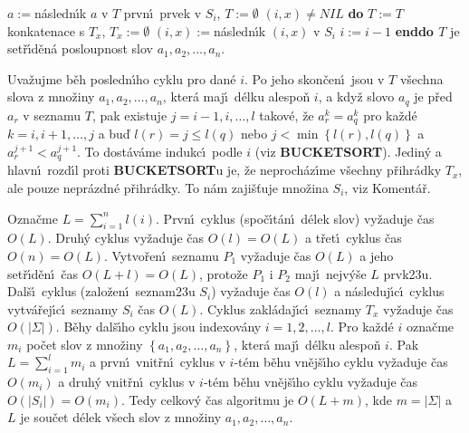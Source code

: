 \phantom{------}$a:=$n\'asledn\'\i k $a$ v $T$\newline 
{}prvn\'\i\ prvek v $S_i$, $T:=\emptyset$\newline 
\phantom{---}{\bf while} $\left(i,x\right)\ne NIL$ {\bf do}\newline 
\phantom{------}$T:=T$ konkatenace s $T_x$, $T_x:=\emptyset$\newline 
\phantom{------}$\left(i,x\right):=$n\'asledn\'\i k $\left(i,x\right)$ v $S_i$\newline 
\phantom{---}{\bf enddo}\newline
\phantom{---}$i:=i-1$\newline 
{\bf enddo\newline 
$T$} je set\v r\'\i d\v en\'a posloupnost slov $a_1,a_2,\dots,a_n$.
\bigskip

\flushpar Uva\v zujme b\v eh posledn\'\i ho cyklu pro dan\'e $i$. Po 
jeho skon\v cen\'\i\ jsou v $T$ v\v sechna slova z mno\v ziny 
$a_1,a_2,\dots,a_n$, kter\'a maj\'\i\ d\'elku alespo\v n $i$, a kdy\v z slovo 
$a_q$ je p\v red $a_r$ v seznamu $T$, pak existuje $j=i-1,i,\dots
,l$
takov\'e, \v ze $a^k_r=a^k_q$ pro ka\v zd\'e $k=i,i+1,\dots,j$ a bu\v d 
$l\left(r\right)=j\le l\left(q\right)$ nebo $j<\min\left\{l\left(r\right),l\left(q\right)\right\}$ a $a_r^{j+1}<a_q^{j+1}$. To 
dost\'av\'ame indukc\'\i\ podle $i$ (viz {\bf BUCKETSORT}). Jedin\'y a 
hlavn\'\i\ rozd\'\i l proti {\bf BUCKETSORT}u je, \v ze neproch\'az\'\i me 
v\v sechny p\v rihr\'adky $T_x$, ale pouze nepr\'azdn\'e p\v rihr\'adky. 
To n\'am zaji\v s\v tuje mno\v zina $S_i$, viz Koment\'a\v r. 
\medskip

\flushpar Ozna\v cme $L=\sum_{i=1}^nl\left(i\right)$. Prvn\'\i\ cyklus (spo\v c\'\i t\'an\'\i\ 
d\'elek slov) vy\-\v zaduje \v cas $O\left(L\right)$. Druh\'y cyklus vy\v zaduje 
\v cas $O\left(l\right)=O\left(L\right)$ a t\v ret\'\i\ cyklus \v cas $O\left(n\right)=O\left(L\right)$. Vytvo\v ren\'\i\ 
seznamu $P_1$ vy\v zaduje \v cas $O\left(L\right)$ a jeho set\v r\'\i d\v en\'\i\ 
\v cas $O\left(L+l\right)=O\left(L\right)$, proto\v ze $P_1$ i $P_2$ maj\'\i\ nejv\'y\v se $
L$ 
prvk\accent23u. Dal\v s\'\i\ cyklus (zalo\v zen\'\i\ seznam\accent23u 
$S_i$) vy\v zaduje \v cas $O\left(l\right)$ a n\'asleduj\'\i c\'\i\ cyklus vytv\'a\v rej\'\i c\'\i\ 
seznamy $S_i$ \v cas $O\left(L\right)$. Cyklus zakl\'adaj\'\i c\'\i\ 
seznamy $T_x$ vy\v zaduje \v cas $O\left(|\Sigma |\right)$. B\v ehy dal\v s\'\i ho cyklu jsou 
indexov\'any $i=1,2,\dots,l$. Pro ka\v zd\'e $i$ ozna\v cme $m_i$ po\v cet slov z 
mno\v ziny $\left\{a_1,a_2,\dots,a_n\right\}$, kter\'a maj\'\i\ d\'elku alespo\v n $
i$. Pak 
$L=\sum_{i=1}^lm_i$ a prvn\'\i\ vnit\v rn\'\i\ cyklus v $i$-t\'em b\v ehu vn\v ej\v s\'\i ho 
cyklu vy\v zaduje \v cas $O\left(m_i\right)$ a druh\'y vnit\v rn\'\i\ cyklus v $
i$-t\'em 
b\v ehu vn\v ej\v s\'\i ho cyklu vy\v zaduje \v cas $O\left(|S_i|\right)=O\left(m_
i\right)$. Tedy 
celkov\'y \v cas algoritmu je $O\left(L+m\right)$, kde $m=|\Sigma |$ a $L$ 
je sou\v cet d\'elek v\v sech slov z mno\v ziny $a_1,a_2,\dots,a_
n$.
\medskip

